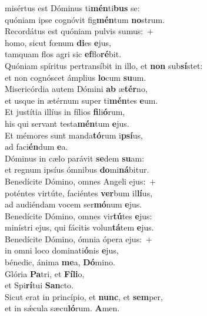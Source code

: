 \oddverse  misértus est Dóminus ti\textbf{mén}ti\textbf{bus} se:~\*\\
\oddverse quóniam ipse cognóvit fig\textbf{mén}tum \textbf{no}strum.\\
\evenverse Recordátus est quóniam pulvis sumus:~+\\
\evenverse  homo, sicut fœnum \textbf{di}es \textbf{e}jus,~\*\\
\evenverse tamquam flos agri sic \textbf{ef}flo\textbf{ré}bit.\\
\oddverse Quóniam spíritus pertransíbit in illo, et \textbf{non} sub\textbf{sí}stet:~\*\\
\oddverse et non cognóscet ámplius \textbf{lo}cum \textbf{su}um.\\
\evenverse Misericórdia autem Dómini \textbf{ab} æ\textbf{tér}no,~\*\\
\evenverse et usque in ætérnum super ti\textbf{mén}tes \textbf{e}um.\\
\oddverse Et justítia illíus in fílios \textbf{fi}li\textbf{ó}rum,~\*\\
\oddverse his qui servant testa\textbf{mén}tum \textbf{e}jus.\\
\evenverse Et mémores sunt manda\textbf{tó}rum i\textbf{psí}us,~\*\\
\evenverse ad faci\textbf{én}dum \textbf{e}a.\\
\oddverse Dóminus in cælo parávit \textbf{se}dem \textbf{su}am:~\*\\
\oddverse et regnum ipsíus ómnibus \textbf{do}mi\textbf{ná}bitur.\\
\evenverse Benedícite Dómino, omnes Angeli ejus:~+\\
\evenverse  poténtes virtúte, faciéntes \textbf{ver}bum il\textbf{lí}us,~\*\\
\evenverse ad audiéndam vocem ser\textbf{mó}num \textbf{e}jus.\\
\oddverse Benedícite Dómino, omnes vir\textbf{tú}tes \textbf{e}jus:~\*\\
\oddverse minístri ejus, qui fácitis volun\textbf{tá}tem \textbf{e}jus.\\
\evenverse Benedícite Dómino, ómnia ópera ejus:~+\\
\evenverse  in omni loco dominati\textbf{ó}nis \textbf{e}jus,~\*\\
\evenverse bénedic, ánima \textbf{me}a, \textbf{Dó}mino.\\
\oddverse Glória \textbf{Pa}tri, et \textbf{Fí}\textbf{li}o,~\*\\
\oddverse et Spi\textbf{rí}tui \textbf{San}cto.\\
\evenverse Sicut erat in princípio, et \textbf{nunc}, et \textbf{sem}per,~\*\\
\evenverse et in sǽcula sæcu\textbf{ló}rum. \textbf{A}men.\\
